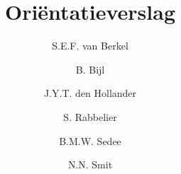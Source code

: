 \documentclass[a4paper]{article}
\title{\casamproject Ori\"{e}ntatieverslag}
\author{S.E.F. van Berkel \and B. Bijl \and J.Y.T. den Hollander \and S. Rabbelier \and B.M.W. Sedee \and N.N. Smit}
\begin{document}
\begin{titlepage}

\maketitle

\thispagestyle{empty}

\end{titlepage}

\setcounter{page}{2}
\setcounter{tocdepth}{2}

\tableofcontents

\newpage

\noindent









\newpage


\end{document}
